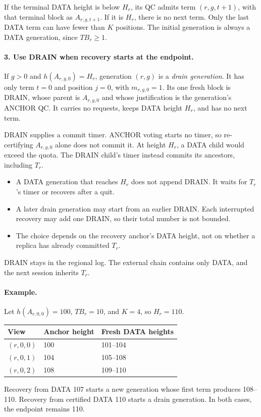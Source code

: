 \documentclass[11pt,a4paper]{article}
\newcommand{\TB}{\mathit{TB}}
\begin{document}
If the terminal DATA height is below $H_r$, its QC admits term
$(r,g,t+1)$, with that terminal block as $A_{r,g,t+1}$. If it is $H_r$,
there is no next term. Only the last DATA term can have fewer than $K$
positions. The initial generation is always a DATA generation, since
$\TB_r\ge1$.

\paragraph{3. Use DRAIN when recovery starts at the endpoint.}
If $g>0$ and $h(A_{r,g,0})=H_r$, generation $(r,g)$ is a
\emph{drain generation}. It has only term $t=0$ and position $j=0$,
with $m_{r,g,0}=1$. Its one fresh block is DRAIN, whose parent is
$A_{r,g,0}$ and whose justification is the generation's ANCHOR QC.
It carries no requests, keeps DATA height $H_r$, and has no next term.

DRAIN supplies a commit timer. ANCHOR voting starts no timer, so
re-certifying $A_{r,g,0}$ alone does not commit it. At height $H_r$, a
DATA child would exceed the quota. The DRAIN child's timer instead
commits its ancestors, including $T_r$.
\begin{itemize}
\item A DATA generation that reaches $H_r$ does not append DRAIN.
It waits for $T_r$'s timer or recovers after a quit.
\item A later drain generation may start from an earlier DRAIN.
Each interrupted recovery may add one DRAIN, so their total number
is not bounded.
\item The choice depends on the recovery anchor's DATA height, not on
whether a replica has already committed $T_r$.
\end{itemize}
DRAIN stays in the regional log. The external chain contains only DATA,
and the next session inherits $T_r$.

\paragraph{Example.}
Let $h(A_{r,0,0})=100$, $\TB_r=10$, and $K=4$, so $H_r=110$.
\begin{center}\small
\begin{tabular}{@{}lll@{}}\toprule
View & Anchor height & Fresh DATA heights\\\midrule
$(r,0,0)$ & 100 & 101--104\\
$(r,0,1)$ & 104 & 105--108\\
$(r,0,2)$ & 108 & 109--110\\\bottomrule
\end{tabular}
\end{center}
Recovery from DATA 107 starts a new generation whose first term produces
108--110. Recovery from certified DATA 110 starts a drain generation.
In both cases, the endpoint remains 110.
\end{document}
